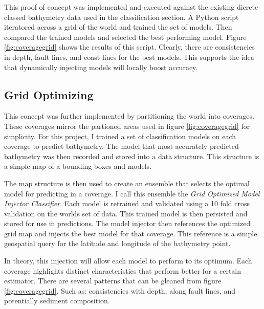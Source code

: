 \par
This proof of concept was implemented and executed against the existing dicrete classed bathymetry data used in the classification section.
A Python script iteratored across a grid of the world and trained the set of models.
Then compared the trained models and selected the best performing model.
Figure \ref{fig:coveragegrid} shows the results of this script.
Clearly, there are consistencies in depth, fault lines, and coast lines for the best models.
This supports the idea that dynamically injecting models will locally boost accuracy.

\subsection{Grid Optimizing}
This concept was further implemented by partitioning the world into coverages.
These coverages mirror the partioned areas used in figure \ref{fig:coveragegrid} for simplicity.
For this project, I trained a set of classification models on each coverage to predict bathymetry.
The model that most accurately predicted bathymetry was then recorded and stored into a data structure.
This structure is a simple map of a bounding boxes and models.

\par
The map structure is then used to create an ensemble that selects the optimal model for predicting in a coverage.
I call this ensemble the \textit{Grid Optimized Model Injector Classifier}.
Each model is retrained and validated using a 10 fold cross validation on the worlds set of data.
This trained model is then persisted and stored for use in predictions.
The model injector then references the optimized grid map and injects the best model for that coverage.
This reference is a simple geospatial query for the latitude and longitude of the bathymetry point.

\par
In theory, this injection will allow each model to perform to its optimum.
Each coverage highlights distinct characteristics that perform better for a certain estimator.
There are several patterns that can be gleaned from figure \ref{fig:coveragegrid}. 
Such as: consistencies with depth, along fault lines, and potentially sediment composition. 



